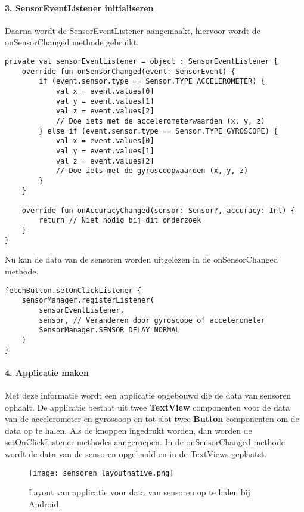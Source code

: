 \paragraph{3. SensorEventListener initialiseren}
Daarna wordt de SensorEventListener aangemaakt, hiervoor wordt de onSensorChanged methode gebruikt.
\begin{verbatim}
private val sensorEventListener = object : SensorEventListener {
    override fun onSensorChanged(event: SensorEvent) {
        if (event.sensor.type == Sensor.TYPE_ACCELEROMETER) {
            val x = event.values[0]
            val y = event.values[1]
            val z = event.values[2]
            // Doe iets met de accelerometerwaarden (x, y, z)
        } else if (event.sensor.type == Sensor.TYPE_GYROSCOPE) {
            val x = event.values[0]
            val y = event.values[1]
            val z = event.values[2]
            // Doe iets met de gyroscoopwaarden (x, y, z)
        }
    }

    override fun onAccuracyChanged(sensor: Sensor?, accuracy: Int) {
        return // Niet nodig bij dit onderzoek
    }
}
\end{verbatim}
Nu kan de data van de sensoren worden uitgelezen in de onSensorChanged methode.
\begin{verbatim}
fetchButton.setOnClickListener {
    sensorManager.registerListener(
        sensorEventListener,
        sensor, // Veranderen door gyroscope of accelerometer
        SensorManager.SENSOR_DELAY_NORMAL
    )
}
\end{verbatim}

\paragraph{4. Applicatie maken}
Met deze informatie wordt een applicatie opgebouwd die de data van sensoren 
ophaalt. De applicatie bestaat uit twee \textbf{TextView} componenten voor de data van de 
accelerometer en gyroscoop en tot slot twee \textbf{Button} componenten om de data op te halen. 
Als de knoppen ingedrukt worden, dan worden de setOnClickListener methodes aangeroepen.
In de onSensorChanged methode wordt de data van de sensoren opgehaald en in de TextViews
geplaatst.
\begin{figure}[H]
    \centering
    \texttt{[image: sensoren\_layoutnative.png]}
    \caption{Layout van applicatie voor data van sensoren op te halen bij Android.}
\end{figure}
